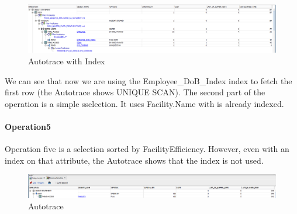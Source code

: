 \begin{figure}[H]
    \centering
    \includegraphics[width=\textwidth]{images/OldManWithIndex.png}
    \caption{Autotrace with Index}
\end{figure}

We can see that now we are using the Employee\_DoB\_Index index to fetch the first row (the Autotrace shows UNIQUE SCAN). The second part of the operation is a simple sselection. It uses Facility.Name with is already indexed.

\paragraph{Operation5} \leavevmode \newline


Operation five is a selection sorted by FacilityEfficiency. However, even with an index on that attribute, the Autotrace shows that the index is not used.

\begin{figure}[H]
    \centering
    \includegraphics[width=\textwidth]{images/EffScore.png}
    \caption{Autotrace}
\end{figure}